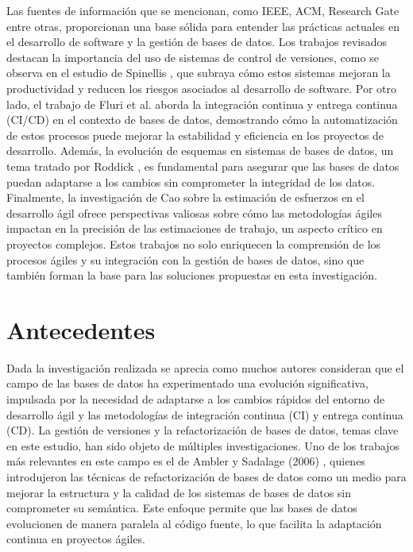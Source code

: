\documentclass{IEEEtran}
\begin{document}
Las fuentes de información que se mencionan, como IEEE, ACM, Research Gate entre otras, proporcionan una base sólida para entender las prácticas actuales en el desarrollo de software y la gestión de bases de datos. Los trabajos revisados destacan la importancia del uso de sistemas de control de versiones, como se observa en el estudio de Spinellis \cite{spinellis2005version}, que subraya cómo estos sistemas mejoran la productividad y reducen los riesgos asociados al desarrollo de software. Por otro lado, el trabajo de Fluri et al. \cite{fluri2023measuring} aborda la integración continua y entrega continua (CI/CD) en el contexto de bases de datos, demostrando cómo la automatización de estos procesos puede mejorar la estabilidad y eficiencia en los proyectos de desarrollo. Además, la evolución de esquemas en sistemas de bases de datos, un tema tratado por Roddick \cite{roddick1992schema}, es fundamental para asegurar que las bases de datos puedan adaptarse a los cambios sin comprometer la integridad de los datos. Finalmente, la investigación de Cao \cite{cao2022estimating} sobre la estimación de esfuerzos en el desarrollo ágil ofrece perspectivas valiosas sobre cómo las metodologías ágiles impactan en la precisión de las estimaciones de trabajo, un aspecto crítico en proyectos complejos. Estos trabajos no solo enriquecen la comprensión de los procesos ágiles y su integración con la gestión de bases de datos, sino que también forman la base para las soluciones propuestas en esta investigación.


\section{Antecedentes}

Dada la investigación realizada se aprecia como muchos autores consideran que el campo de las bases de datos ha experimentado una evolución significativa, impulsada por la necesidad de adaptarse a los cambios rápidos del entorno de desarrollo ágil y las metodologías de integración continua (CI) y entrega continua (CD). La gestión de versiones y la refactorización de bases de datos, temas clave en este estudio, han sido objeto de múltiples investigaciones. Uno de los trabajos más relevantes en este campo es el de Ambler y Sadalage (2006) \cite{ambler2006refactoring}, quienes introdujeron las técnicas de refactorización de bases de datos como un medio para mejorar la estructura y la calidad de los sistemas de bases de datos sin comprometer su semántica. Este enfoque permite que las bases de datos evolucionen de manera paralela al código fuente, lo que facilita la adaptación continua en proyectos ágiles. 
\end{document}
